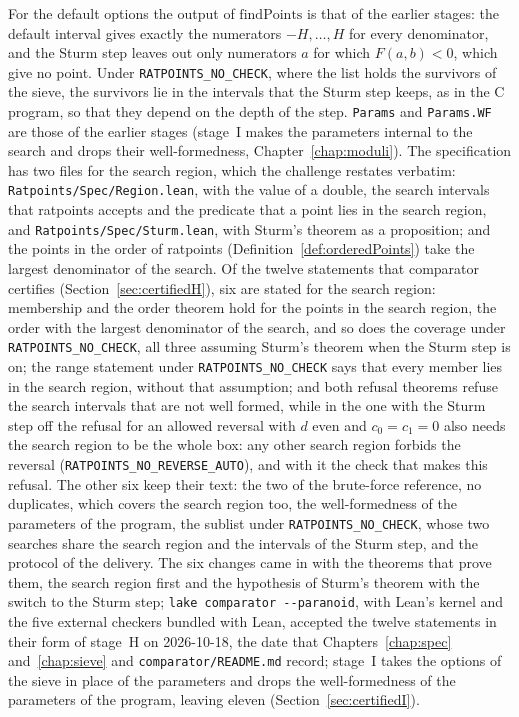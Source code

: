 For the default options the output of $\mathrm{findPoints}$ is that of the earlier stages: the
default interval gives exactly the numerators $-H, \dots, H$ for every denominator, and the Sturm
step leaves out only numerators $a$ for which $F(a, b) < 0$, which give no point. Under
\verb|RATPOINTS_NO_CHECK|, where the list holds the survivors of the sieve, the survivors lie in the
intervals that the Sturm step keeps, as in the C program, so that they depend on the depth of the
step. \verb|Params| and \verb|Params.WF| are those of the earlier stages (stage~I makes the
parameters internal to the search and drops their well-formedness, Chapter~\ref{chap:moduli}). The
specification has two files for the search region, which the challenge restates verbatim:
\verb|Ratpoints/Spec/Region.lean|, with the value of a double, the search intervals that ratpoints
accepts and the predicate that a point lies in the search region, and
\verb|Ratpoints/Spec/Sturm.lean|, with Sturm's theorem as a proposition; and the points in the order
of ratpoints (Definition~\ref{def:orderedPoints}) take the largest denominator of the search. Of the
twelve statements that comparator certifies (Section~\ref{sec:certifiedH}), six are stated for the
search region: membership and the order theorem hold for the points in the search region, the order
with the largest denominator of the search, and so does the coverage under
\verb|RATPOINTS_NO_CHECK|, all three assuming Sturm's theorem when the Sturm step is on; the range
statement under \verb|RATPOINTS_NO_CHECK| says that every member lies in the search region, without
that assumption; and both refusal theorems refuse the search intervals that are not well formed,
while in the one with the Sturm step off the refusal for an allowed reversal with $d$ even and
$c_0 = c_1 = 0$ also needs the search region to be the whole box: any other search region forbids
the reversal (\verb|RATPOINTS_NO_REVERSE_AUTO|), and with it the check that makes this refusal. The
other six keep their text: the two of the brute-force reference, no duplicates, which covers the
search region too, the well-formedness of the parameters of the program, the sublist under
\verb|RATPOINTS_NO_CHECK|, whose two searches share the search region and the intervals of the Sturm
step, and the protocol of the delivery. The six changes came in with the theorems that prove them,
the search region first and the hypothesis of Sturm's theorem with the switch to the Sturm step;
\verb|lake comparator --paranoid|, with Lean's kernel and the five external checkers bundled with
Lean, accepted the twelve statements in their form of stage~H on 2026-10-18, the date that
Chapters~\ref{chap:spec} and~\ref{chap:sieve} and \verb|comparator/README.md| record; stage~I takes
the options of the sieve in place of the parameters and drops the well-formedness of the parameters
of the program, leaving eleven (Section~\ref{sec:certifiedI}).

